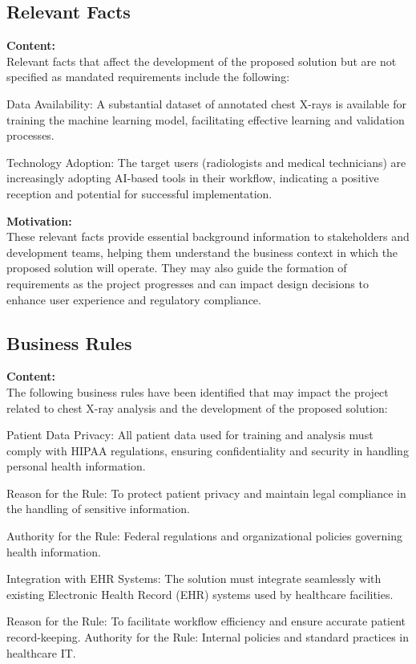\documentclass[12pt]{article}
\begin{document}
\subsection{Relevant Facts}

\textbf{Content:}\\
Relevant facts that affect the development of the proposed solution but are not specified as 
mandated requirements include the following:

Data Availability: A substantial dataset of annotated chest X-rays is available for training the 
machine learning model, facilitating effective learning and validation processes.

Technology Adoption: The target users (radiologists and medical technicians) are increasingly 
adopting AI-based tools in their workflow, indicating a positive reception and potential for 
successful implementation.

\textbf{Motivation:}\\
These relevant facts provide essential background information to stakeholders and development 
teams, helping them understand the business context in which the proposed solution will operate. 
They may also guide the formation of requirements as the project progresses and can impact design 
decisions to enhance user experience and regulatory compliance.

\subsection{Business Rules}
\textbf{Content:}\\
The following business rules have been identified that may impact the project related to chest 
X-ray analysis and the development of the proposed solution:

Patient Data Privacy: All patient data used for training and analysis must comply with HIPAA 
regulations, ensuring confidentiality and security in handling personal health information.

Reason for the Rule: To protect patient privacy and maintain legal compliance in the handling of 
sensitive information.

Authority for the Rule: Federal regulations and organizational policies governing health 
information.

Integration with EHR Systems: The solution must integrate seamlessly with existing Electronic 
Health Record (EHR) systems used by healthcare facilities.

Reason for the Rule: To facilitate workflow efficiency and ensure accurate patient record-keeping.
Authority for the Rule: Internal policies and standard practices in healthcare IT.
\end{document}

